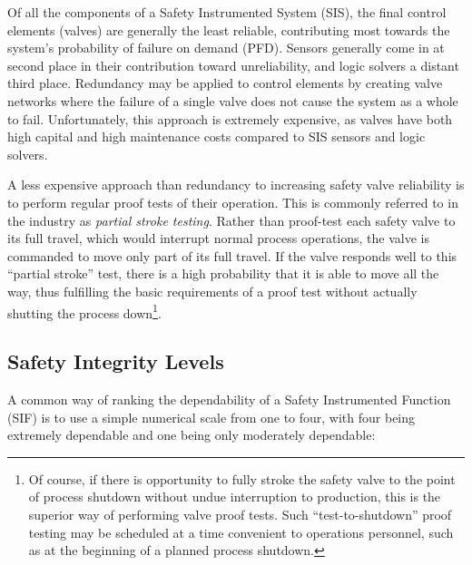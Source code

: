 \vskip 10pt

Of all the components of a Safety Instrumented System (SIS), the final control elements (valves) are generally the least reliable, contributing most towards the system's probability of failure on demand (PFD).  Sensors generally come in at second place in their contribution toward unreliability, and logic solvers a distant third place.  Redundancy may be applied to control elements by creating valve networks where the failure of a single valve does not cause the system as a whole to fail.  Unfortunately, this approach is extremely expensive, as valves have both high capital and high maintenance costs compared to SIS sensors and logic solvers.

A less expensive approach than redundancy to increasing safety valve reliability is to perform regular proof tests of their operation.  This is commonly referred to in the industry as \textit{partial stroke testing}.  Rather than proof-test each safety valve to its full travel, which would interrupt normal process operations, the valve is commanded to move only part of its full travel.  If the valve responds well to this ``partial stroke'' test, there is a high probability that it is able to move all the way, thus fulfilling the basic requirements of a proof test without actually shutting the process down\footnote{Of course, if there is opportunity to fully stroke the safety valve to the point of process shutdown without undue interruption to production, this is the superior way of performing valve proof tests.  Such ``test-to-shutdown'' proof testing may be scheduled at a time convenient to operations personnel, such as at the beginning of a planned process shutdown.}.  







\filbreak
\subsection{Safety Integrity Levels}

A common way of ranking the dependability of a Safety Instrumented Function (SIF) is to use a simple numerical scale from one to four, with four being extremely dependable and one being only moderately dependable:


